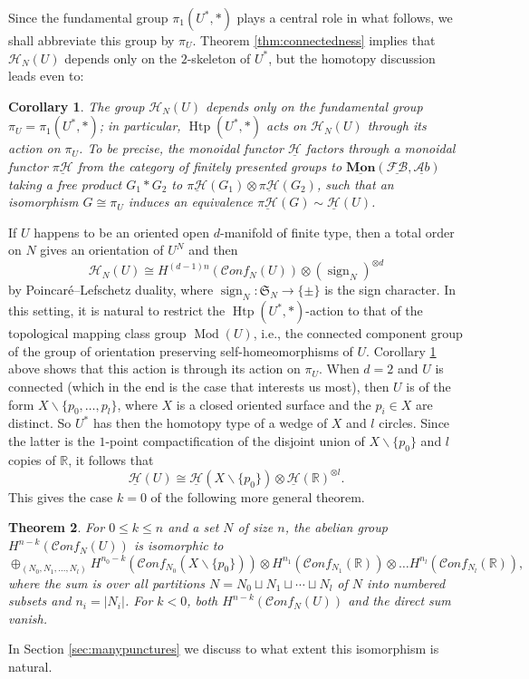 \documentclass[12pt,letterpaper]{amsart}
\numberwithin{equation}{section}
\def\RR{{\mathbb R}}
\def\ssm{\smallsetminus}
\def\Hcal{{\mathcal H}}
\def\uHcal{{\underline\Hcal}}
\newcommand\FB{\underline{\mathcal {F\!B}}}
\newcommand \Zmod{\underline{\mathcal A b}}
\def\Sfrak{\mathfrak{S}}
\newcommand\conf{\mathscr{C}\!\mathit{onf}\!}
\newcommand\Htp{\operatorname{Htp}}
\newcommand\Mod{\operatorname{Mod}}
\newcommand\sign{\operatorname{sign}}
\newtheorem{theorem}{Theorem}[section]
\newtheorem{corollary}[theorem]{Corollary}
\theoremstyle{remark}
\begin{document}
Since the  fundamental group $\pi_1(U^*,*)$ plays  a central role in what follows, we shall  abbreviate this group by $\pi_U$. 
Theorem \ref{thm:connectedness} implies that $\Hcal_N(U)$ depends only on the $2$-skeleton of $U^*$, but the homotopy discussion leads even to:

\begin{corollary}\label{cor:fundgrpdependence}
The group $\Hcal_N(U)$ depends only on the fundamental group $\pi_U=\pi_1(U^*,*)$;  in particular, $\Htp(U^*,*)$ acts on $\Hcal_N(U)$ through its action on $\pi_U$. To be precise, the monoidal  functor 
$\uHcal$  factors through  a monoidal functor $\underline{\pi\Hcal}$ from the  category 
of  finitely presented groups to $\underline{\mathbf{Mon}}(\FB, \Zmod)$ taking  a free product $G_1*G_2$ to $\underline{\pi\Hcal}(G_1)\otimes \underline{\pi\Hcal}(G_2)$,  such that an isomorphism $G\cong \pi_U$ induces an equivalence  
$\underline{\pi\Hcal}(G)\sim\uHcal(U)$.
\end{corollary}


If $U$ happens to be an oriented  open  $d$-manifold of finite type, then a total order on $N$ gives an orientation of $U^N$
and  then  
\[
\Hcal_N(U)\cong H^{(d-1)n}(\conf_N(U))\otimes (\sign_N)^{\otimes d}
\]
by Poincar\'e--Lefschetz duality, where  $\sign_N: \Sfrak_N\to \{\pm\}$ is the sign character. In this  setting, it is natural to restrict the $\Htp(U^*,*)$-action to that of the topological mapping class group $\Mod(U)$, i.e., the connected component group  of the group of orientation preserving self-homeomorphisms of $U$. Corollary \ref{cor:fundgrpdependence} above  shows that this action is through its action on $\pi_U$.
When $d=2$ and $U$ is connected (which in the end is the case that interests us most), then  $U$ is of the form $X\ssm \{p_0, \dots , p_l\}$, where $X$ is a closed oriented surface and the $p_i\in X$ are distinct. So $U^*$ has then the  homotopy type of a wedge of $X$ and $l$ circles. 
Since the  latter is the $1$-point compactification of the disjoint union of $X\ssm \{p_0\}$ and $l$ copies of $\RR$, it follows that 
\[
\uHcal(U)\cong \uHcal(X\ssm \{p_0\})\otimes \uHcal(\RR)^{\otimes l}.
\]
This gives the case $k=0$ of the following more general theorem.
\begin{theorem}\label{thm:manypuncturesalldegrees}
    For $0\le k\le n$ and a set $N$ of size $n$, the abelian group $H^{n-k}(\conf_N(U))$ is isomorphic to 
    $$
    \oplus_{(N_0, N_1,\dots, N_l )} H^{n_0-k}(\conf_{N_0}(X\ssm\{p_0\}))\otimes H^{n_1}(\conf_{N_1}(\RR))\otimes \dots H^{n_{l}}(\conf_{N_{l}}(\RR)),
    $$
    where the sum is over all partitions $N=N_0\sqcup N_1\sqcup \cdots\sqcup N_l $ of $N$ into numbered subsets and  $n_i=|N_i|$. For $k<0$, both $H^{n-k}(\conf_N(U))$ and the direct sum vanish.
\end{theorem}
In Section \ref{sec:manypunctures} we discuss to what extent this isomorphism is natural.
\smallskip
\end{document}
